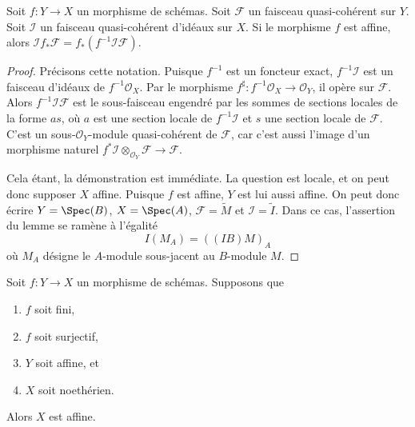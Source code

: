 \begin{lemma}
\label{lemma-affine-morphism-projection-ideal}
Soit $f : Y \to X$ un morphisme de schémas.
Soit $\mathcal{F}$ un faisceau quasi-cohérent sur $Y$.
Soit $\mathcal{I}$ un faisceau quasi-cohérent d'idéaux sur $X$.
Si le morphisme $f$ est affine, alors
$\mathcal{I}f_*\mathcal{F} = f_*(f^{-1}\mathcal{I}\mathcal{F})$.
\end{lemma}

\begin{proof}
Précisons cette notation. Puisque $f^{-1}$ est un
foncteur exact, $f^{-1}\mathcal{I}$ est un
faisceau d'idéaux de $f^{-1}\mathcal{O}_X$. Par le morphisme
$f^\sharp : f^{-1}\mathcal{O}_X \to \mathcal{O}_Y$, il opère sur
$\mathcal{F}$. Alors $f^{-1}\mathcal{I}\mathcal{F}$ est le sous-faisceau
engendré par les sommes de sections locales de la forme $as$, où $a$
est une section locale de $f^{-1}\mathcal{I}$ et $s$ une section locale
de $\mathcal{F}$. C'est un sous-$\mathcal{O}_Y$-module quasi-cohérent
de $\mathcal{F}$, car c'est aussi l'image d'un morphisme naturel
$f^*\mathcal{I} \otimes_{\mathcal{O}_Y} \mathcal{F} \to \mathcal{F}$.

\medskip\noindent
Cela étant, la démonstration est immédiate. La question est locale, et
on peut donc supposer $X$ affine. Puisque $f$ est affine,
$Y$ est lui aussi affine. On peut donc écrire
$Y = \Spec(B)$, $X = \Spec(A)$, $\mathcal{F} = \widetilde{M}$
et $\mathcal{I} = \widetilde{I}$. Dans ce cas, l'assertion du
lemme se ramène à l'égalité
$$
I(M_A) = ((IB)M)_A
$$
où $M_A$ désigne le $A$-module sous-jacent au $B$-module $M$.
\end{proof}

\begin{lemma}
\label{lemma-image-affine-finite-morphism-affine-Noetherian}
Soit $f : Y \to X$ un morphisme de schémas. Supposons
que
\begin{enumerate}
\item $f$ soit fini,
\item $f$ soit surjectif,
\item $Y$ soit affine, et
\item $X$ soit noethérien.
\end{enumerate}
Alors $X$ est affine.
\end{lemma}


